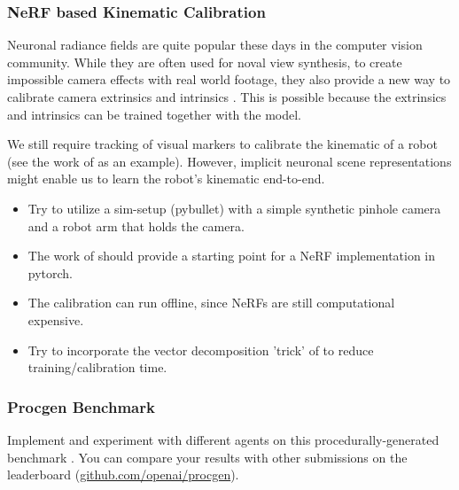\documentclass[a4paper]{article}
\begin{document}
\subsubsection{NeRF based Kinematic Calibration}
Neuronal radiance fields are quite popular these days in the computer vision community. While they are often used for noval view synthesis, to create impossible camera effects with real world footage, they also provide a new way to calibrate camera extrinsics and intrinsics \cite{lin2021barf, Sucar:etal:ICCV2021, wang2021nerfmm, SCNeRF2021}.
This is possible because the extrinsics and intrinsics can be trained together with the model.

We still require tracking of visual markers to calibrate the kinematic of a robot (see the work of \cite{Birbach2014} as an example).
However, implicit neuronal scene representations might enable us to learn the robot's kinematic end-to-end.

\begin{itemize}
  \item Try to utilize a sim-setup (pybullet) with a simple synthetic pinhole camera and a robot arm that holds the camera.
  \item The work of \cite{SCNeRF2021} should provide a starting point for a NeRF implementation in pytorch.
  \item The calibration can run offline, since NeRFs are still computational expensive.
  \item Try to incorporate the vector decomposition 'trick' of \cite{TensoRF} to reduce training/calibration time.
\end{itemize}





\subsubsection{Procgen Benchmark}
Implement and experiment with different agents on this procedurally-generated benchmark \cite{procgen2020}.
You can compare your results with other submissions on the leaderboard (\url{github.com/openai/procgen}).
\end{document}
